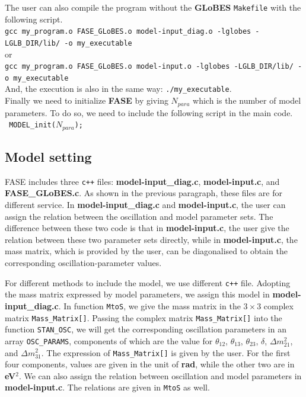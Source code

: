 \documentclass[a4paper,11pt]{article}
\begin{document}
The user can also compile the program without the \textbf{GLoBES} \texttt{Makefile} with the following script.\vspace{0.2cm}\\
\texttt{gcc my\_program.o FASE\_GLoBES.o model-input\_diag.o -lglobes -LGLB\_DIR/lib/ -o my\_executable}\\
or\\
\texttt{gcc my\_program.o FASE\_GLoBES.o model-input.o -lglobes -LGLB\_DIR/lib/ -o my\_executable}\vspace{0.2cm}\\
And, the execution is also in the same way: \texttt{./my\_executable}.\\

Finally we need to initialize \textbf{FASE} by giving $N_{para}$ which is the number of model parameters. To do so, we need to include the following script in the main code.\\
\texttt{    MODEL\_init($N_{para}$); }\vspace{0.2cm}\\ 

\subsection{Model setting}\label{sec:model_set}

FASE includes three \texttt{c++} files: \textbf{model-input\_diag.c}, \textbf{model-input.c}, and \textbf{FASE\_GLoBES.c}. As shown in the previous paragraph, these files are for different service. In \textbf{model-input\_diag.c} and \textbf{model-input.c}, the user can assign the relation between the oscillation and model parameter sets. The difference between these two code is that in \textbf{model-input.c}, the user give the relation between these two parameter sets directly, while in \textbf{model-input.c}, the mass matrix, which is provided by the user, can be diagonalised to obtain the corresponding oscillation-parameter values. 

For different methods to include the model, we use different \texttt{c++} file. Adopting the mass matrix expressed by model parameters, we assign this model in \textbf{model-input\_diag.c}. In function \texttt{MtoS}, we give
the mass matrix in the $3\times3$ complex matrix \texttt{Mass\_Matrix[]}.
%
Passing the complex matrix \texttt{Mass\_Matrix[]} into the function \texttt{STAN\_OSC}, we will get the corresponding oscillation parameters in an array \texttt{OSC\_PARAMS}, components of which are the value for $\theta_{12}$, $\theta_{13}$, $\theta_{23}$, $\delta$, $\Delta m_{21}^2$, and $\Delta m_{31}^2$. The expression of \texttt{Mass\_Matrix[]} is given by the user. For the first four components, values are given in the unit of \textbf{rad}, while the other two are in \textbf{eV$^2$}.  We can also assign the relation between oscillation and model parameters in \textbf{model-input.c}. The relations are given in \texttt{MtoS} as well.
\end{document}
